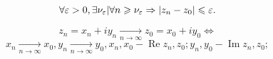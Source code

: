 

\begin{col-answer-preambule}
  \begin{equation}
    \label{eq:lecture10-01}
    \forall \varepsilon > 0, \exists \nu_{\varepsilon} \vert \forall n \geqslant \nu_{\varepsilon} \Rightarrow \left\lvert z_n - z_0 \right\rvert \leqslant \varepsilon.
  \end{equation}
\end{col-answer-preambule}
\begin{theorem}
  \begin{equation}
    \label{eq:lecture10-02}
    z_n = x_n + iy_n \xrightarrow[n \to \infty]{} z_0 = x_0 + iy_0 \Leftrightarrow
  \end{equation}
  \begin{equation}
    \label{eq:lecture10-03}
    x_n \xrightarrow[n \to \infty]{} x_0, y_n \xrightarrow[n \to \infty]{} y_0, x_n,x_0 - \operatorname{Re} z_n, z_0; y_n, y_0 - \operatorname{Im} z_n, z_0;
  \end{equation}
\end{theorem}
